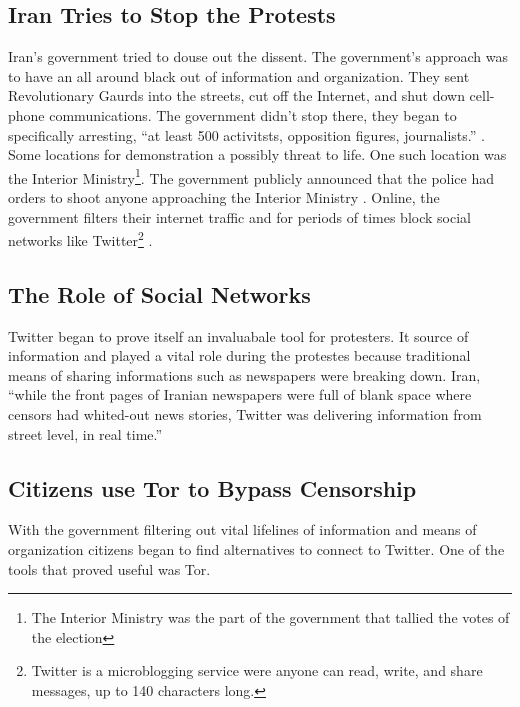 \documentclass[11pt]{article}
\begin{document}
\begin{multicols}{2}
\subsection{Iran Tries to Stop the Protests}

Iran's government tried to douse out the dissent. The government's approach was
to have an all around black out of information and organization. They sent
Revolutionary Gaurds into the streets, cut off the Internet, and shut down
cell-phone communications\cite{TheIranianVote}. The government didn't stop
there, they began to specifically arresting, ``at least 500 activitsts,
opposition figures, journalists.'' \cite{IranProtestsFifthDayOfUnrest}.  Some
locations for demonstration a possibly threat to life.  One such location was
the Interior Ministry\footnote{The Interior Ministry was the part of the
government that tallied the votes of the election}. The government publicly
announced that the police had orders to shoot anyone approaching the Interior
Ministry \cite{TheIranianVote}. Online, the government filters their internet
traffic and for periods of times block social networks like
Twitter\footnote{Twitter is a microblogging service were anyone can read, write,
and share messages, up to 140 characters long.\cite{WhatIsTwitter}}
\cite{IranBlocksFacebookTwitter}.

\subsection{The Role of Social Networks}

Twitter began to prove itself an invaluabale tool for protesters. It source of
information and played a vital role during the protestes because traditional
means of sharing informations such as newspapers were breaking down. Iran,
``while the front pages of Iranian newspapers were full of blank space where
censors had whited-out news stories, Twitter was delivering information from
street level, in real time.''\cite{WhyTwitterIsTheMedium}

\subsection{Citizens use Tor to Bypass Censorship}

With the government filtering out vital lifelines of information and means of
organization citizens began to find alternatives to connect to Twitter. One of
the tools that proved useful was Tor.


\end{multicols}
\end{document}
